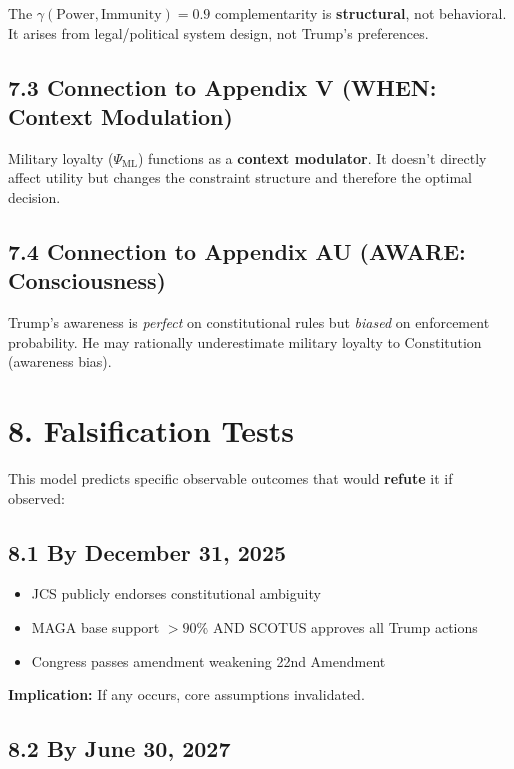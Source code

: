 \documentclass[11pt]{article}
\begin{document}
The $\gamma(\text{Power}, \text{Immunity}) = 0.9$ complementarity is \textbf{structural}, not behavioral. It arises from legal/political system design, not Trump's preferences.

\subsection{7.3 Connection to Appendix V (WHEN: Context Modulation)}

Military loyalty ($\Psi_{\text{ML}}$) functions as a \textbf{context modulator}. It doesn't directly affect utility but changes the constraint structure and therefore the optimal decision.

\subsection{7.4 Connection to Appendix AU (AWARE: Consciousness)}

Trump's awareness is \textit{perfect} on constitutional rules but \textit{biased} on enforcement probability. He may rationally underestimate military loyalty to Constitution (awareness bias).

\section{8. Falsification Tests}

This model predicts specific observable outcomes that would \textbf{refute} it if observed:

\subsection{8.1 By December 31, 2025}

\begin{itemize}
\item[ ] JCS publicly endorses constitutional ambiguity
\item[ ] MAGA base support $> 90\%$ AND SCOTUS approves all Trump actions
\item[ ] Congress passes amendment weakening 22nd Amendment
\end{itemize}

\textbf{Implication:} If any occurs, core assumptions invalidated.

\subsection{8.2 By June 30, 2027}
\end{document}
